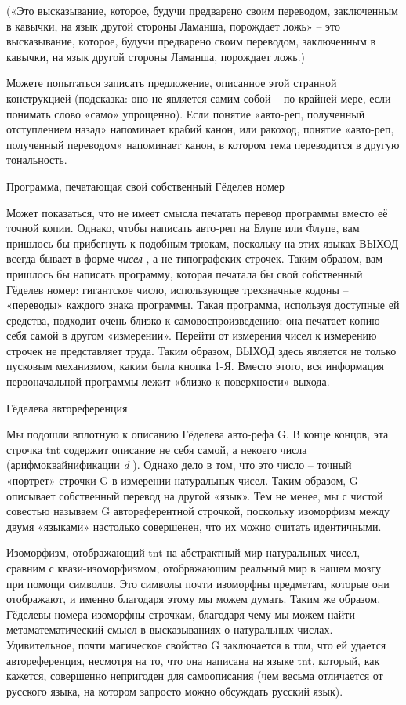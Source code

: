 \documentclass[../main.tex]{subfiles}
\begin{document}
(«Это высказывание, которое, будучи предварено своим переводом, заключенным в кавычки, на язык другой стороны Ламанша, порождает ложь» \--- это высказывание, которое, будучи предварено своим переводом, заключенным в кавычки, на язык другой стороны Ламанша, порождает ложь.)

Можете попытаться записать предложение, описанное этой странной конструкцией (подсказка: оно не является самим собой \--- по крайней мере, если понимать слово «само» упрощенно). Если понятие «авто-реп, полученный отступлением назад» напоминает крабий канон, или ракоход, понятие «авто-реп, полученный переводом» напоминает канон, в котором тема переводится в другую тональность.

Программа, печатающая свой собственный Гёделев номер

Может показаться, что не имеет смысла печатать перевод программы вместо её точной копии. Однако, чтобы написать авто-реп на Блупе или Флупе, вам пришлось бы прибегнуть к подобным трюкам, поскольку на этих языках ВЫХОД всегда бывает в форме \emph{чисел} , а не типографских строчек. Таким образом, вам пришлось бы написать программу, которая печатала бы свой собственный Гёделев номер: гигантское число, использующее трехзначные кодоны \--- «переводы» каждого знака программы. Такая программа, используя доступные ей средства, подходит очень близко к самовоспроизведению: она печатает копию себя самой в другом «измерении». Перейти от измерения чисел к измерению строчек не представляет труда. Таким образом, ВЫХОД здесь является не только пусковым механизмом, каким была кнопка 1-Я. Вместо этого, вся информация первоначальной программы лежит «близко к поверхности» выхода.

Гёделева автореференция

Мы подошли вплотную к описанию Гёделева авто-рефа G. В конце концов, эта строчка \acs{tnt} содержит описание не себя самой, а некоего числа (арифмоквайнификации \emph{d} ). Однако дело в том, что это число \--- точный «портрет» строчки G в измерении натуральных чисел. Таким образом, G описывает собственный перевод на другой «язык». Тем не менее, мы с чистой совестью называем G автореферентной строчкой, поскольку изоморфизм между двумя «языками» настолько совершенен, что их можно считать идентичными.

Изоморфизм, отображающий \acs{tnt} на абстрактный мир натуральных чисел, сравним с квази-изоморфизмом, отображающим реальный мир в нашем мозгу при помощи символов. Это символы почти изоморфны предметам, которые они отображают, и именно благодаря этому мы можем думать. Таким же образом, Гёделевы номера изоморфны строчкам, благодаря чему мы можем найти метаматематический смысл в высказываниях о натуральных числах. Удивительное, почти магическое свойство G заключается в том, что ей удается автореференция, несмотря на то, что она написана на языке \acs{tnt}, который, как кажется, совершенно непригоден для самоописания (чем весьма отличается от русского языка, на котором запросто можно обсуждать русский язык).
\end{document}
